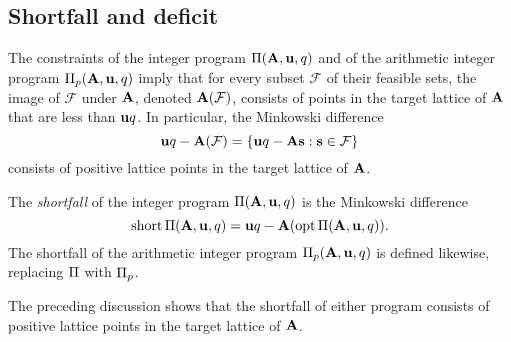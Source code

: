 \documentclass{amsart}
\begin{document}
\subsection{Shortfall and deficit}
\label{ss: shortfall and deficit}

The constraints of the integer program $\Pi(\mathbf{A},\mathbf{u},q)$ and of the arithmetic integer program $\Pi_p(\mathbf{A},\mathbf{u},q)$ imply that for every subset $\mathcal{F}$ of their feasible sets, the image of $\mathcal{F}$ under $\mathbf{A}$, denoted $\mathbf{A}(\mathcal{F})$, consists of points in the target lattice of $\mathbf{A}$ that are less than $\mathbf{u}q$.
In particular, the Minkowski difference
\[\mathbf{u}q-\mathbf{A}(\mathcal{F}) = \{\mathbf{u}q - \mathbf{A} \mathbf{s}: \mathbf{s}\in \mathcal{F}\}\]
consists of positive lattice points in the target lattice of $\mathbf{A}$.

\begin{definition}
   The \emph{shortfall} of the integer program $\Pi(\mathbf{A}, \mathbf{u}, q)$ is the Minkowski difference
   \[ \operatorname{short} \Pi(\mathbf{A}, \mathbf{u}, q) = \mathbf{u}q - \mathbf{A}( \operatorname{opt} \Pi(\mathbf{A}, \mathbf{u}, q)).\]
   The shortfall of the arithmetic integer program $\Pi_p(\mathbf{A}, \mathbf{u}, q)$ is defined likewise, replacing $\Pi$ with $\Pi_p$.
\end{definition}

The preceding discussion shows that the shortfall of either program consists of positive lattice points in the target lattice of $\mathbf{A}$.
\end{document}
